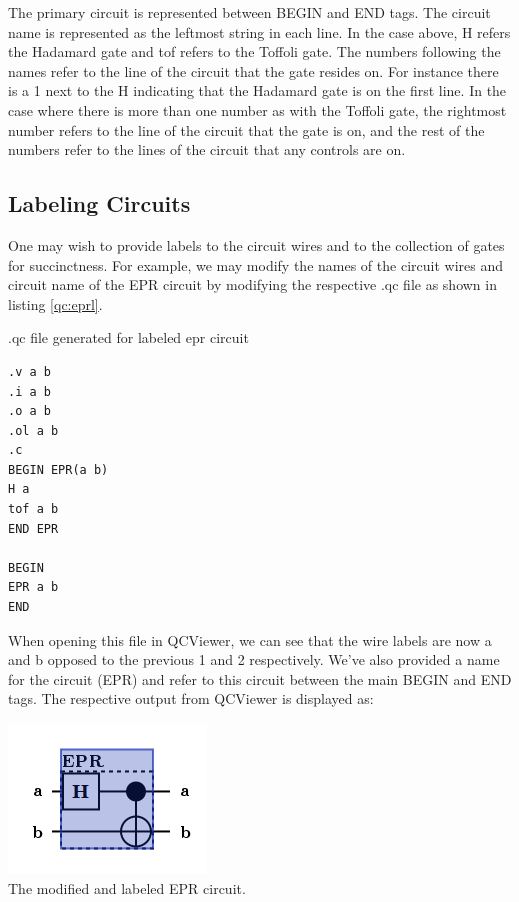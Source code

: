 \documentclass[10pt]{article}
\theoremstyle{definition}
\begin{document}
The primary circuit is represented between BEGIN and END tags. The circuit name is represented as the leftmost string in each line. In the case above, H refers the Hadamard gate and tof refers to the Toffoli gate. The numbers following the names refer to the line of the circuit that the gate resides on. For instance there is a 1 next to the H indicating that the Hadamard gate is on the first line. In the case where there is more than one number as with the Toffoli gate, the rightmost number refers to the line of the circuit that the gate is on, and the rest of the numbers refer to the lines of the circuit that any controls are on.

\subsection{Labeling Circuits}\label{sec:LabelingCircuits}

One may wish to provide labels to the circuit wires and to the collection of gates for succinctness. For example, we may modify the names of the circuit wires and circuit name of the EPR circuit by modifying the respective .qc file as shown in listing \ref{qc:eprl}.

\begin{program}
\caption{ .qc file generated for labeled epr circuit}
\label{qc:eprl}
\begin{verbatim}
.v a b
.i a b
.o a b
.ol a b
.c
BEGIN EPR(a b)
H a
tof a b
END EPR

BEGIN
EPR a b
END
\end{verbatim}
\end{program}

When opening this file in QCViewer, we can see that the wire labels are now a and b opposed to the previous 1 and 2 respectively. We've also provided a name for the circuit (EPR) and refer to this circuit between the main BEGIN and END tags. The respective output from QCViewer is displayed as:

\begin{center}
\includegraphics[scale=.7]{Figures/QCFiles/EPRCircuitLabel} \\
The modified and labeled EPR circuit.
\end{center}
\end{document}

